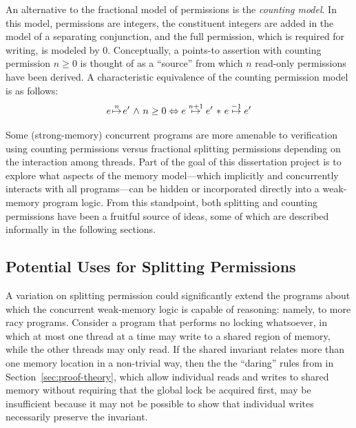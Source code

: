 \documentclass[11pt]{report}
\begin{document}
An alternative to the fractional model of permissions is the \emph{counting model}. In this model, permissions are integers, the constituent integers are added in the model of a separating conjunction, and the full permission, which is required for writing, is modeled by 0. Conceptually, a points-to assertion with counting permission $n \geq 0$ is thought of as a ``source'' from which $n$ read-only permissions have been derived. A characteristic equivalence of the counting permission model is as follows: \[ e \stackrel{n}{\!\mapsto\!} e' \operatorname{\,\wedge\,} n \geq 0 \Leftrightarrow e \stackrel{n+1}{\!\mapsto\!} e' \operatorname{\,\ast\,} e \stackrel{-1}{\!\mapsto\!} e'\] 

Some (strong-memory) concurrent programs are more amenable to verification using counting permissions versus fractional splitting permissions depending on the interaction among threads. Part of the goal of this dissertation project is to explore what aspects of the memory model---which implicitly and concurrently interacts with all programs---can be hidden or incorporated directly into a weak-memory program logic. From this standpoint, both splitting and counting permissions have been a fruitful source of ideas, some of which are described informally in the following sections. 


\subsection{Potential Uses for Splitting Permissions}

A variation on splitting permission could significantly extend the programs about which the concurrent weak-memory logic is capable of reasoning: namely, to more racy programs. Consider a program that performs no locking whatsoever, in which at most one thread at a time may write to a shared region of memory, while the other threads may only read. If the shared invariant relates more than one memory location in a non-trivial way, then the the ``daring'' rules from in Section~\ref{sec:proof-theory}, which allow individual reads and writes to shared memory without requiring that the global lock be acquired first, may be insufficient because it may not be possible to show that individual writes necessarily preserve the invariant.
\end{document}
